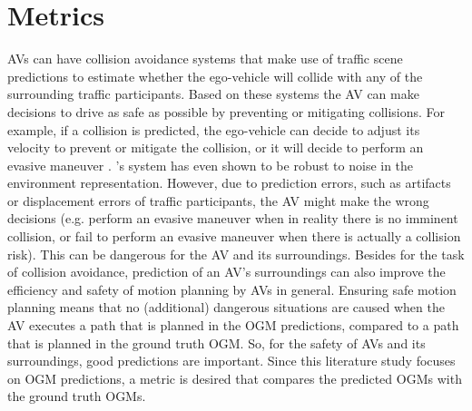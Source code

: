 


\newpage

\section{Metrics} \label{sec:metrics}

\glspl{AV} can have collision avoidance systems that make use of traffic scene predictions to estimate whether the ego-vehicle will collide with any of the surrounding traffic participants. Based on these systems the \gls{AV} can make decisions to drive as safe as possible by preventing or mitigating collisions. For example, if a collision is predicted, the ego-vehicle can decide to adjust its velocity to prevent or mitigate the collision, or it will decide to perform an evasive maneuver \cite{annell2016probabilistic} \cite{wang2019crash}. \cite{annell2016probabilistic}'s system has even shown to be robust to noise in the environment representation. However, due to prediction errors, such as artifacts or displacement errors of traffic participants, the \gls{AV} might make the wrong decisions (e.g. perform an evasive maneuver when in reality there is no imminent collision, or fail to perform an evasive maneuver when there is actually a collision risk). This can be dangerous for the \gls{AV} and its surroundings. Besides for the task of collision avoidance, prediction of an \gls{AV}'s surroundings can also improve the efficiency and safety of motion planning by \glspl{AV} in general. Ensuring safe motion planning means that no (additional) dangerous situations are caused when the \gls{AV} executes a path that is planned in the \gls{OGM} predictions, compared to a path that is planned in the ground truth \gls{OGM}. So, for the safety of \glspl{AV} and its surroundings, good predictions are important. Since this literature study focuses on \gls{OGM} predictions, a metric is desired that compares the predicted \glspl{OGM} with the ground truth \glspl{OGM}. \\

